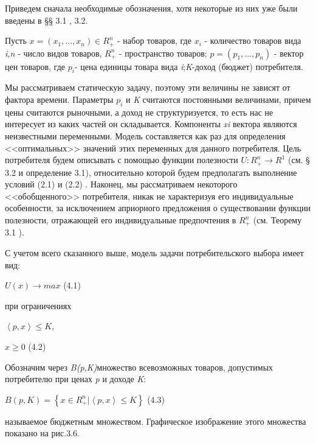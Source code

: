 \documentclass[12pt, 4paper]{book}
\begin{document}
{Приведем сначала необходимые обозначения, хотя некоторые из них уже были введены в §§ 3.1 , 3.2.
\par

Пусть $x = (x_1,...,x_n)\in R_{+}^{n}$ - набор товаров, где $x_i$ - количество товаров вида \textit{i,n} - число видов товаров, $R_{+}^{n}$ - пространство товаров; $p=(p_1,...,p_n)$ - вектор цен товаров, где $p_i$- цена единицы товара вида \textit{i};\textit{K}-доход (бюджет) потребителя.
\par

Мы рассматриваем статическую задачу, поэтому эти величины не зависят от фактора времени. Параметры $p_i$ и \textit{K} считаются постоянными величинами, причем цены считаются рыночными, а доход не структуризуется, то есть нас не интересует из каких частей он складывается. Компоненты \textit{xi} вектора являются неизвестными переменными. Модель составляется как раз для определения <<оптимальных>> значений этих переменных для данного потребителя. Цель потребителя будем описывать с помощью функции полезности 
$U:R_{+}^{n} \rightarrow R^1$ (см.  § 3.2 и определение 3.1), относительно которой будем предполагать выполнение условий (2.1) и (2.2) . Наконец, мы рассматриваем некоторого <<обобщенного>> потребителя, никак не характеризуя его индивидуальные особенности, за исключением априорного предложения о существовании функции полезности, отражающей его индивидуальные предпочтения в $R_{+}^{n}$ (см. Теорему 3.1 ).
\par

С учетом всего сказанного выше, модель задачи потребительского выбора имеет вид:
\begin{center}
$U(x) \rightarrow max$ (4.1)
\end{center}
\par
при ограничениях 
\begin{center}
$\left\langle p,x \right\rangle \leq K$,
\end{center}
\begin{center} 
$x \geq 0$ (4.2)
\end{center}
\par

Обозначим через  \textit{B(p,K)}множество всевозможных товаров, допустимых потребителю при ценах \textit{p} и доходе \textit{K}:
\begin{center}
$B(p,K) =  \left\{ x \in R_{+}^{n}| \left\langle p,x \right\rangle \leq K \right\}$ (4.3)
\end{center}
называемое бюджетным множеством. Графическое изображение этого множества показано на рис.3.6. 
\par

}
\end{document}
